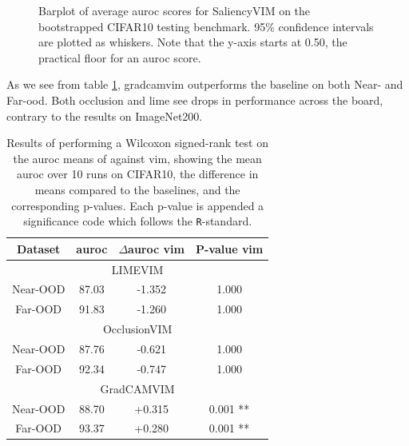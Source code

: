 \documentclass[UKenglish]{uiomasterthesis} %
\theoremstyle{definition}
\begin{document}
\begin{figure}[H]
    \begin{center}
        
    \end{center}
    \caption[CIFAR10 SaliencyVIM Bootstrap]{Barplot of average \ac{auroc} scores for SaliencyVIM on the bootstrapped CIFAR10 testing benchmark. 95\% confidence intervals are plotted as whiskers. Note that the y-axis starts at 0.50, the practical floor for an \ac{auroc} score.}
    \label{fig:cifar10_salvim_bootstrap_barplot}
\end{figure}

As we see from table \ref{table:cifar10_salvim_ttest}, \ac{gradcam}\ac{vim} outperforms the baseline on both Near- and Far-\ac{ood}. Both occlusion and \ac{lime} see drops in performance across the board, contrary to the results on ImageNet200.

\begin{table}[H]
\setlength\tabcolsep{3pt}
\begin{center}
\begin{tabular}{ |c|c|c|c| }
    \hline
    Dataset & \ac{auroc} & $\Delta$\ac{auroc} \ac{vim} & P-value \ac{vim} \\
    \hline
    \hline
    \multicolumn{4}{|c|}{LIMEVIM} \\
    \hline
    \rowcolor{near!50}
    Near-OOD & 87.03 & -1.352 & 1.000 \\
    \rowcolor{far!50}
    Far-OOD & 91.83 & -1.260 & 1.000 \\
    \hline
    \hline
    \multicolumn{4}{|c|}{OcclusionVIM} \\
    \hline
    \rowcolor{near!50}
    Near-OOD & 87.76 & -0.621 & 1.000 \\
    \rowcolor{far!50}
    Far-OOD & 92.34 & -0.747 & 1.000 \\
    \hline
    \hline
    \multicolumn{4}{|c|}{GradCAMVIM} \\
    \hline
    \rowcolor{near!50}
    Near-OOD & 88.70 & +0.315 & 0.001 ** \\
    \rowcolor{far!50}
    Far-OOD & 93.37 & +0.280 & 0.001 ** \\
    \hline
    \end{tabular}
    \caption[Wilcoxon signed-rank test for salvim on CIFAR10]{Results of performing a Wilcoxon signed-rank test on the \ac{auroc} means of against \ac{vim}, showing the mean \ac{auroc} over 10 runs on CIFAR10, the difference in means compared to the baselines, and the corresponding p-values. Each p-value is appended a significance code which follows the \texttt{R}-standard.}
    \label{table:cifar10_salvim_ttest}
\end{center}
\setlength\tabcolsep{6pt}
\end{table}
\end{document}
